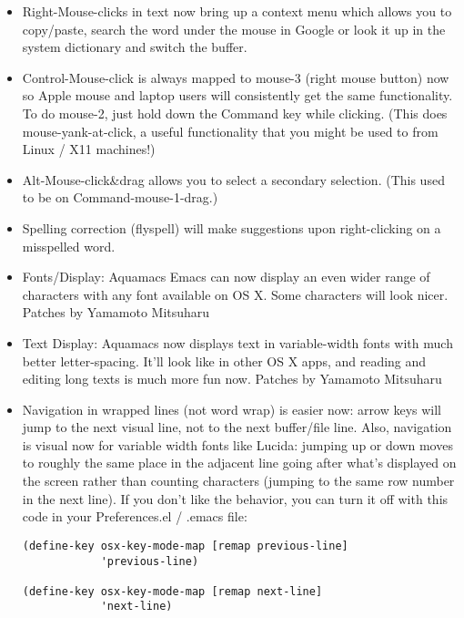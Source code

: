\begin{itemize}
\item Right-Mouse-clicks in text now bring up a context menu which
	allows you to copy/paste, search the word under the mouse in
	Google or look it up in the system dictionary and switch the buffer.

\item Control-Mouse-click is always mapped to mouse-3 (right mouse
	button) now so Apple mouse and laptop users will consistently get the same
	functionality. To do mouse-2, just hold down the Command key while
	clicking. (This does mouse-yank-at-click, a useful functionality that you
	might be used to from Linux / X11 machines!)

\item Alt-Mouse-click\&drag allows you to select a secondary
	selection. (This used to be on Command-mouse-1-drag.)
	
\item Spelling correction (flyspell) will make suggestions upon
	right-clicking on a misspelled word.

\item Fonts/Display: Aquamacs Emacs can now display an even wider
	range of characters with any font available on OS X. Some
	characters will look nicer.  
	Patches by Yamamoto Mitsuharu

\item Text Display: Aquamacs now displays text in variable-width fonts
	with much better letter-spacing. It'll look like in other OS X
	apps, and reading and editing long texts is much more fun now.
	Patches by Yamamoto Mitsuharu

\item Navigation in wrapped lines (not word wrap) is easier now: arrow
	keys will jump to the next visual line, not to the next
	buffer/file line. Also, navigation is visual now for variable
	width fonts like Lucida: jumping up or down moves to roughly the
	same place in the adjacent line going after what's displayed on
	the screen rather than counting characters (jumping to the same
	row number in the next line).  If you don't like the behavior, you
	can turn it off with this code in your Preferences.el / .emacs
	file:

\begin{verbatim} 
(define-key osx-key-mode-map [remap previous-line]
            'previous-line)

(define-key osx-key-mode-map [remap next-line] 
            'next-line)
\end{verbatim}


\end{itemize}
